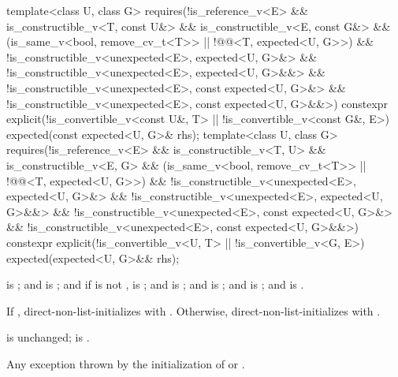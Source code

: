 %
\begin{itemdecl}
template<class U, class G>
  requires(!is_reference_v<E> && is_constructible_v<T, const U&> &&
           is_constructible_v<E, const G&> &&
           (is_same_v<bool, remove_cv_t<T>> ||
            !@@<T, expected<U, G>>) &&
           !is_constructible_v<unexpected<E>, expected<U, G>&> &&
           !is_constructible_v<unexpected<E>, expected<U, G>&&> &&
           !is_constructible_v<unexpected<E>, const expected<U, G>&> &&
           !is_constructible_v<unexpected<E>, const expected<U, G>&&>)
constexpr explicit(!is_convertible_v<const U&, T> || !is_convertible_v<const G&, E>)
    expected(const expected<U, G>& rhs);
template<class U, class G>
  requires(!is_reference_v<E> && is_constructible_v<T, U> && is_constructible_v<E, G> &&
           (is_same_v<bool, remove_cv_t<T>> ||
            !@@<T, expected<U, G>>) &&
           !is_constructible_v<unexpected<E>, expected<U, G>&> &&
           !is_constructible_v<unexpected<E>, expected<U, G>&&> &&
           !is_constructible_v<unexpected<E>, const expected<U, G>&> &&
           !is_constructible_v<unexpected<E>, const expected<U, G>&&>)
constexpr explicit(!is_convertible_v<U, T> || !is_convertible_v<G, E>)
    expected(expected<U, G>&& rhs);
\end{itemdecl}

\begin{itemdescr}
\pnum
\constraints
{} is ; and  is ; and if  is not ,  is ; and  is ; and  is ; and  is ; and  is .

\pnum
\effects
If , direct-non-list-initializes  with . Otherwise, direct-non-list-initializes  with .

\pnum
\ensures
{} is unchanged;  is .

\pnum
\throws
Any exception thrown by the initialization of  or .
\end{itemdescr}

